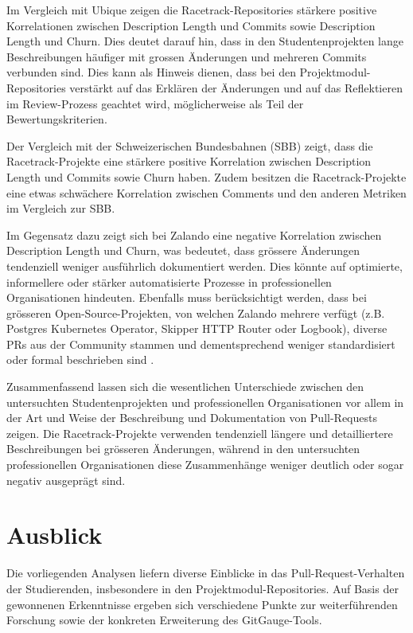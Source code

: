 Im Vergleich mit Ubique zeigen die Racetrack-Repositories stärkere positive Korrelationen zwischen Description Length und Commits sowie Description Length und Churn. Dies deutet darauf hin, dass in den Studentenprojekten lange Beschreibungen häufiger mit grossen Änderungen und mehreren Commits verbunden sind. Dies kann als Hinweis dienen, dass bei den Projektmodul-Repositories verstärkt auf das Erklären der Änderungen und auf das Reflektieren im Review-Prozess geachtet wird, möglicherweise als Teil der Bewertungskriterien. 

Der Vergleich mit der Schweizerischen Bundesbahnen (SBB) zeigt, dass die Race\-track-Projekte eine stärkere positive Korrelation zwischen Description Length und Commits sowie Churn haben. Zudem besitzen die Racetrack-Projekte eine etwas schwächere Korrelation zwischen Comments und den anderen Metriken im Vergleich zur SBB.

Im Gegensatz dazu zeigt sich bei Zalando eine negative Korrelation zwischen Description Length und Churn, was bedeutet, dass grössere Änderungen tendenziell weniger ausführlich dokumentiert werden. Dies könnte auf optimierte, informellere oder stärker automatisierte Prozesse in professionellen Organisationen hindeuten. Ebenfalls muss berücksichtigt werden, dass bei grösseren Open-Source-Projekten, von welchen Zalando mehrere verfügt (z.B. Postgres Kubernetes Operator, Skipper HTTP Router oder Logbook), diverse PRs aus der Community stammen und dementsprechend weniger standardisiert oder formal beschrieben sind \parencite{noauthor_zalandologbook_2025}\parencite{noauthor_zalandoskipper_2025}\parencite{noauthor_zalandopostgres-operator_2025}.

Zusammenfassend lassen sich die wesentlichen Unterschiede zwischen den untersuchten Studentenprojekten und professionellen Organisationen vor allem in der Art und Weise der Beschreibung und Dokumentation von Pull-Requests zeigen. Die Racetrack-Projekte verwenden tendenziell längere und detailliertere Beschreibungen bei grösseren Änderungen, während in den untersuchten professionellen Organisationen diese Zusammenhänge weniger deutlich oder sogar negativ ausgeprägt sind.


\section{Ausblick}
Die vorliegenden Analysen liefern diverse Einblicke in das Pull-Request-Verhalten der Studierenden, insbesondere in den Projektmodul-Repositories. 
Auf Basis der gewonnenen Erkenntnisse ergeben sich verschiedene Punkte zur weiterführenden Forschung sowie der konkreten Erweiterung des GitGauge-Tools. 

